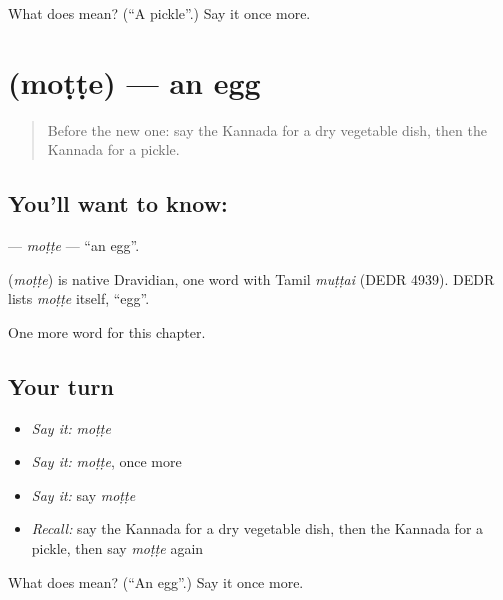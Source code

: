 \begin{tcolorbox}[breakable,colback=teal!4,colframe=teal!35!black,title={Before you move on}]
What does  mean? (\textquotedblleft{}A pickle\textquotedblright{}.) Say it once more.
\end{tcolorbox}
\section[\texorpdfstring{\kn{ಮೊಟ್ಟೆ} (moṭṭe)}{ಮೊಟ್ಟೆ (moṭṭe)}]{ (moṭṭe) — an egg}

\label{lesson:KA-C122-motte}



\begin{quote}
Before the new one: say the Kannada for a dry vegetable dish, then the Kannada for a pickle.
\end{quote}

\subsection*{You'll want to know: }
\textbf{} — \emph{moṭṭe} — \textquotedblleft{}an egg\textquotedblright{}.

\begin{cousinweb}
\textbf{} (\emph{moṭṭe}) is native Dravidian, one word with Tamil \emph{muṭṭai} (DEDR 4939). DEDR lists \emph{moṭṭe} itself, \textquotedblleft{}egg\textquotedblright{}.
\end{cousinweb}

\begin{grammarlens}[title={What you've built}]
One more word for this chapter.
\end{grammarlens}

\subsection*{Your turn}
\begin{itemize}
\raggedright
  \item \emph{Say it:} \emph{moṭṭe}
  \item \emph{Say it:} \emph{moṭṭe}, once more
  \item \emph{Say it:} say \emph{moṭṭe}
  \item \emph{Recall:} say the Kannada for a dry vegetable dish, then the Kannada for a pickle, then say \emph{moṭṭe} again
\end{itemize}

\begin{tcolorbox}[breakable,colback=teal!4,colframe=teal!35!black,title={Before you move on}]
What does  mean? (\textquotedblleft{}An egg\textquotedblright{}.) Say it once more.
\end{tcolorbox}
